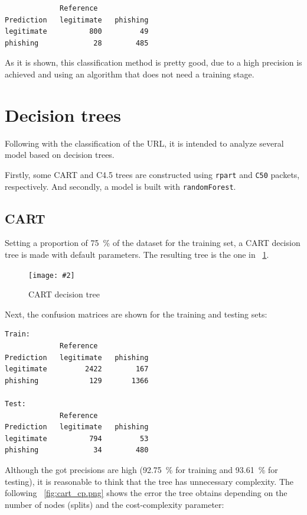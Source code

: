 \documentclass[12pt, a4paper]{article}
\newcommand*{\figref}[1]{\figurename~\ref{fig:#1}}
\newcommand{\figcaption}[4][H]{
  \begin{figure}[#1]
    \centering
    \texttt{[image: \#2]}
    \caption{#3}
    \label{fig:#2}
  \end{figure}
}
\begin{document}
    \begin{verbatim}
             Reference
Prediction   legitimate   phishing
legitimate          800         49
phishing             28        485
    \end{verbatim}

    As it is shown, this classification method is pretty good, due to a high precision is achieved and using an algorithm that does not need a training stage.

  \section{Decision trees}

    Following with the classification of the URL, it is intended to analyze several model based on decision trees.

    Firstly, some CART and C4.5 trees are constructed using \texttt{rpart} and \texttt{C50} packets, respectively. And secondly, a model is built with \texttt{randomForest}.

    \subsection{CART}

      Setting a proportion of \SI{75}{\percent} of the dataset for the training set, a CART decision tree is made with default parameters. The resulting tree is the one in \figref{cart.png}.

      \figcaption{cart.png}{CART decision tree}{1}

      Next, the confusion matrices are shown for the training and testing sets:

      \begin{verbatim}
Train:
             Reference
Prediction   legitimate   phishing
legitimate         2422        167
phishing            129       1366

Test:
             Reference
Prediction   legitimate   phishing
legitimate          794         53
phishing             34        480
      \end{verbatim}

      Although the got precisions are high (\SI{92.75}{\percent} for training and \SI{93.61}{\percent} for testing), it is reasonable to think that the tree has unnecessary complexity. The following \figref{cart_cp.png} shows the error the tree obtains depending on the number of nodes (splits) and the cost-complexity parameter:
\end{document}
